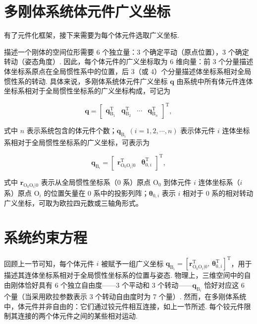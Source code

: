 \section{多刚体系统体元件广义坐标}
有了元件化框架，接下来需要为每个体元件选取广义坐标.
\begin{definition}[定义 9.1（体元件广义坐标）]
描述一个刚体的空间位形需要 6 个独立量：3 个确定平动（原点位置），3 个确定转动（姿态角度）. 因此，每个体元件的广义坐标取为 6 维向量：前 3 个分量描述体坐标系原点在全局惯性系中的位置，后 3（或 4）个分量描述体坐标系相对全局惯性系的转动. 具体来说，多刚体系统体元件广义坐标 $\boldsymbol{q}$ 由系统中所有体元件连体坐标系相对于全局惯性坐标系的广义坐标构成，可记为

\[
\boldsymbol{q} = \begin{bmatrix} \boldsymbol{q}_{\text{B}_1}^\text{T} & \boldsymbol{q}_{\text{B}_2}^\text{T} & \cdots & \boldsymbol{q}_{\text{B}_n}^\text{T} \end{bmatrix}^\text{T},
\]

式中 $n$ 表示系统包含的体元件个数；$\boldsymbol{q}_{\text{B}_i}$ $(i = 1, 2, \cdots, n)$ 表示体元件 $i$ 连体坐标系相对于全局惯性坐标系的广义坐标，可表示为

\[
\boldsymbol{q}_{\text{B}_i} = \begin{bmatrix} \boldsymbol{r}_{\text{O}_0\text{O}_i|0}^\text{T} & \boldsymbol{\theta}_{0,i}^\text{T} \end{bmatrix}^\text{T},
\]

式中 $\boldsymbol{r}_{\text{O}_0\text{O}_i|0}$ 表示从全局惯性坐标系（0 系）原点 $\text{O}_0$ 到体元件 $i$ 连体坐标系（$i$ 系）原点 $\text{O}_i$ 的位置矢量在 0 系中的投影列阵；$\boldsymbol{\theta}_{0,i}$ 表示 $i$ 相对于 0 系的相对转动广义坐标，可取为欧拉四元数或三轴角形式。
\end{definition}
\section{系统约束方程}
回顾上一节可知，每个体元件 $i$ 被赋予一组广义坐标 $\boldsymbol{q}_{\text{B}_i} = [\boldsymbol{r}_{\text{O}_0\text{O}_i|0}^\text{T},\, \boldsymbol{\theta}_{0,i}^\text{T}]^\text{T}$，用于描述其连体坐标系相对于全局惯性坐标系的位置与姿态. 物理上，三维空间中的自由刚体恰好具有 6 个独立自由度——3 个平动和 3 个转动——$\boldsymbol{q}_{\text{B}_i}$ 恰好对应这 6 个量（当采用欧拉参数表示 3 个转动自由度时为 7 个量）.
然而，在多刚体系统中，体元件并非自由的：它们通过铰元件相互连接，如上一节所述. 每个铰元件限制其连接的两个体元件之间的某些相对运动.
